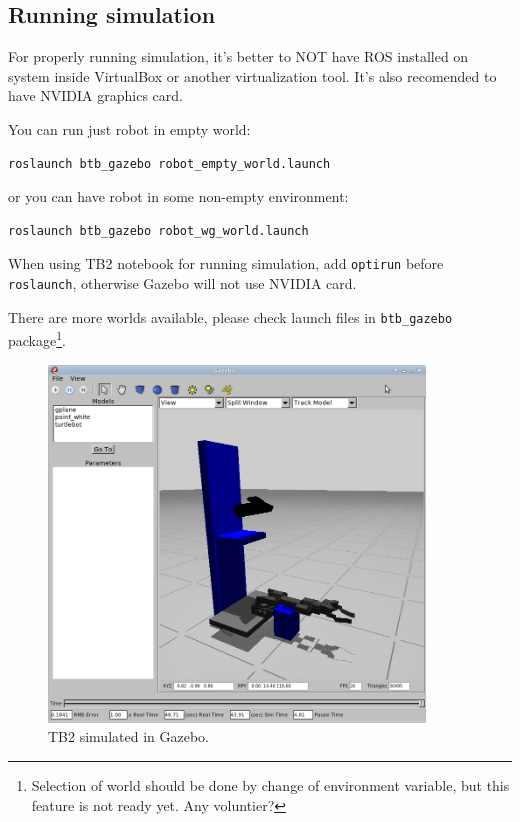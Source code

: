 \documentclass[12pt,a4paper,titlepage]{article}
\numberwithin{equation}{subsection}
\begin{document}
\subsection{Running simulation}

For properly running simulation, it's better to NOT have ROS installed on system inside VirtualBox or another virtualization tool. It's also recomended to have NVIDIA graphics card.

You can run just robot in empty world:

\begin{verbatim}
roslaunch btb_gazebo robot_empty_world.launch
\end{verbatim}

or you can have robot in some non-empty environment:

\begin{verbatim}
roslaunch btb_gazebo robot_wg_world.launch
\end{verbatim}

When using TB2 notebook for running simulation, add \verb|optirun| before \verb|roslaunch|, otherwise Gazebo will not use NVIDIA card.

There are more worlds available, please check launch files in \verb|btb_gazebo| package\footnote{Selection of world should be done by change of environment variable, but this feature is not ready yet. Any voluntier?}.

\begin{center}
 \begin{figure}[h]
	\centering\includegraphics[width=10cm]{./img/tb2-gazebo.png}
 \caption{TB2 simulated in Gazebo.}
 \label{fig:tb2-gazebo}
 \end{figure}
\end{center}
\end{document}
